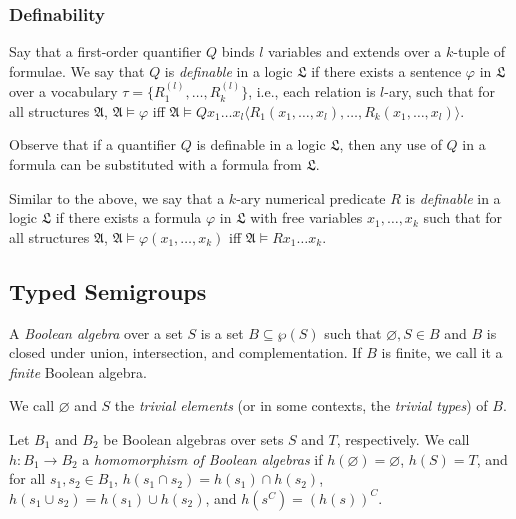 \documentclass[a4paper,UKenglish,cleveref, autoref, thm-restate, anonymous]{lipics-v2021}
\begin{document}
\subsubsection{Definability}\label{sec:backgrounddef}

\begin{definition}
    Say that a first-order quantifier $Q$ binds $l$ variables and extends over a $k$-tuple of formulae. We say that $Q$ is \emph{definable} in a logic $\mathfrak{L}$ if there exists a sentence $\varphi$ in $\mathfrak{L}$ over a vocabulary $\tau = \{R_1^{(l)}, \dots, R_k^{(l)}\}$, i.e., each relation is $l$-ary, such that for all structures $\mathfrak{A}$, $\mathfrak{A} \models \varphi$ iff $\mathfrak{A} \models Qx_1\dots x_l\langle R_1(x_1,\dots,x_l), \dots, R_k(x_1,\dots,x_l)\rangle$.
\end{definition}

\begin{remark}
    Observe that if a quantifier $Q$ is definable in a logic $\mathfrak{L}$, then any use of $Q$ in a formula can be substituted with a formula from $\mathfrak{L}$.
\end{remark}

\begin{definition}
    Similar to the above, we say that a $k$-ary numerical predicate $R$ is \emph{definable} in a logic $\mathfrak{L}$ if there exists a formula $\varphi$ in $\mathfrak{L}$ with free variables $x_1, \dots, x_k$ such that for all structures $\mathfrak{A}$, $\mathfrak{A} \models \varphi(x_1, \dots, x_k)$ iff $\mathfrak{A} \models R x_1\dots x_k$.
\end{definition}

\subsection{Typed Semigroups}\label{sec:backgroundtyped}


\begin{definition}
    A \emph{Boolean algebra} over a set $S$ is a set $B \subseteq \wp(S)$ such that $\varnothing, S \in B$ and $B$ is closed under union, intersection, and complementation. If $B$ is finite, we call it a \emph{finite} Boolean algebra.

    We call $\varnothing$ and $S$ the \emph{trivial elements} (or in some contexts, the \emph{trivial types}) of $B$.
\end{definition}

\begin{definition}
    Let $B_1$ and $B_2$ be Boolean algebras over sets $S$ and $T$, respectively. We call $h : B_1 \rightarrow B_2$ a \emph{homomorphism of Boolean algebras} if $h(\varnothing) = \varnothing$, $h(S) = T$, and for all $s_1, s_2 \in B_1$, $h(s_1 \cap s_2) = h(s_1) \cap h(s_2)$, $h(s_1 \cup s_2) = h(s_1) \cup h(s_2)$, and $h(s^C) = (h(s))^C$.
\end{definition}
\end{document}
